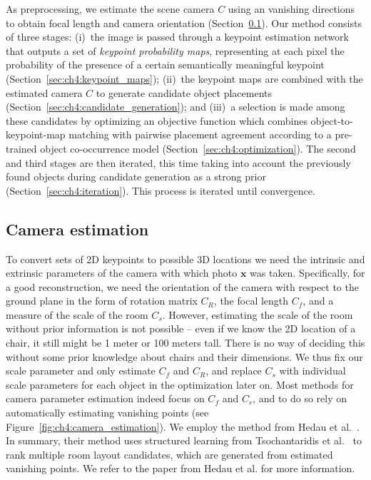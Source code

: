 \documentclass[10pt,twocolumn,letterpaper]{article}
\newcommand{\bb}[1]{{\bm{#1}}}
\begin{document}
As preprocessing, we estimate the scene camera $C$  using an
vanishing directions~\cite{Hedau:2009:ICCV} to obtain focal length and
camera orientation (Section~\ref{sec:ch4:camera_estimation}). Our method consists of  three stages: (i)~the image is
passed through a keypoint estimation network that outputs a set of
\emph{keypoint probability maps}, representing at each pixel the probability of
the presence of a certain semantically meaningful keypoint
(Section~\ref{sec:ch4:keypoint_maps}); 
%
(ii)~the keypoint maps
are combined with the estimated camera $C$ to generate candidate object
placements (Section~\ref{sec:ch4:candidate_generation}); and  
%
(iii)~a
selection is made among these candidates by optimizing an objective function
which combines object-to-keypoint-map matching with pairwise placement agreement
according to a pre-trained object co-occurrence model
(Section~\ref{sec:ch4:optimization}). The second and third stages are then
iterated, this time taking into account the previously found objects during
candidate generation as a strong prior (Section~\ref{sec:ch4:iteration}). This
process is iterated until convergence. 


\subsection{Camera estimation}
\label{sec:ch4:camera_estimation}
To convert sets of 2D keypoints to possible 3D locations we need the intrinsic
and extrinsic parameters of the camera with which photo $\bb{x}$ was taken.
Specifically, for a good reconstruction, we need the orientation of the camera
with respect to the ground plane in the form of rotation matrix $C_R$, the
focal length $C_f$, and a measure of the scale of the room $C_s$.  However,
estimating the scale of the room without prior information is not possible -- even
if we know the 2D location of a chair, it still might be 1 meter or 100 meters tall. There is no way of deciding this
without some prior knowledge about chairs and their dimensions. We thus fix our
scale parameter and only estimate $C_f$ and $C_R$, and replace $C_s$ with
individual scale parameters for each object in the optimization later on.  Most
methods for camera parameter estimation indeed focus on $C_f$ and $C_r$, and to
do so rely on automatically estimating vanishing points (see
Figure~\ref{fig:ch4:camera_estimation}). We employ the method from Hedau et
al.~\cite{Hedau:2009:ICCV}. In summary, their method uses structured learning
from Tsochantaridis et al.~\cite{Tsochantaridis:2005:JMLR} to rank multiple
room layout candidates, which are generated from estimated vanishing points. We
refer to the paper from Hedau et al. for more information.
\end{document}
